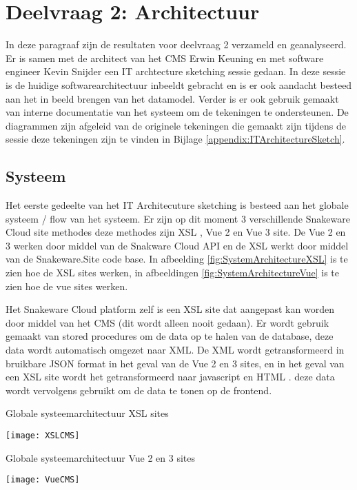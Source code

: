\section{Deelvraag 2: Architectuur}
In deze paragraaf zijn de resultaten voor deelvraag 2 \textit{\SubquestionTwo} verzameld en geanalyseerd.
Er is samen met de architect van het CMS Erwin Keuning en met software engineer Kevin Snijder een IT archtecture sketching sessie gedaan.
In deze sessie is de huidige softwarearchitectuur inbeeldt gebracht en is er ook aandacht besteed aan het in beeld brengen van het datamodel.
Verder is er ook gebruik gemaakt van interne documentatie van het systeem om de tekeningen te ondersteunen.
De diagrammen zijn afgeleid van de originele tekeningen die gemaakt zijn tijdens de sessie deze tekeningen zijn te vinden in Bijlage \ref{appendix:ITArchitectureSketch}.


\subsection{Systeem}
Het eerste gedeelte van het IT Architecuture sketching is besteed aan het globale systeem / flow van het systeem.
Er zijn op dit moment 3 verschillende Snakeware Cloud site methodes deze methodes zijn \gls{XSL} \Parencite{XSL}, Vue 2 en Vue 3 \Parencite{Vue} site.
De Vue 2 en 3 werken door middel van de Snakware Cloud API en de \gls{XSL} werkt door middel van de Snakeware.Site code base.
In afbeelding \ref{fig:SystemArchitectureXSL} is te zien hoe de \gls{XSL} sites werken, in afbeeldingen \ref{fig:SystemArchitectureVue} is te zien hoe de vue sites werken.

\whitespace
Het Snakeware Cloud platform zelf is een \gls{XSL} site dat aangepast kan worden door middel van het CMS (dit wordt alleen nooit gedaan).
Er wordt gebruik gemaakt van stored procedures om de data op te halen van de database, deze data wordt automatisch omgezet naar XML.
De XML wordt getransformeerd in bruikbare JSON format \Parencite{JSON} in het geval van de Vue 2 en 3 sites, en in het geval van een \gls{XSL} site wordt het getransformeerd naar javascript en HTML \Parencite{HTML}.
deze data wordt vervolgens gebruikt om de data te tonen op de frontend.

\whitespace
\begin{graphic}
	\captionsetup{type=figure}
    \caption{Globale systeemarchitectuur \gls{XSL} sites}
	\texttt{[image: XSLCMS]}
	\label{fig:SystemArchitectureXSL}
\end{graphic}
\begin{graphic}
	\captionsetup{type=figure}
	\caption{Globale systeemarchitectuur Vue 2 en 3 sites}
    \texttt{[image: VueCMS]}
	\label{fig:SystemArchitectureVue}
\end{graphic}


